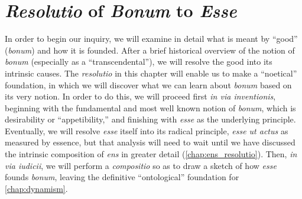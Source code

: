 
\chapter{\emph{Resolutio} of \emph{Bonum} to \emph{Esse}}
\label{chap:bonum}

In order to begin our inquiry, we will examine in detail what is meant by ``good'' (\emph{bonum}) and how it is founded. After a brief historical overview of the notion of \emph{bonum} (especially as a ``transcendental''), we will resolve the good into its intrinsic causes. The \emph{resolutio} in this chapter will enable us to make a ``noetical'' foundation, in which we will discover what we can learn about \emph{bonum} based on its very notion. In order to do this, we will proceed first \emph{in via inventionis}, beginning with the fundamental and most well known notion of \emph{bonum}, which is desirability or ``appetibility,'' and finishing with \emph{esse} as the underlying principle. Eventually, we will resolve \emph{esse} itself into its radical principle, \emph{esse ut actus} as measured by essence, but that analysis will need to wait until we have discussed the intrinsic composition of \emph{ens} in greater detail (\autoref{chap:ens_resolutio}). Then, \emph{in via iudicii}, we will perform a \emph{compositio} so as to draw a sketch of how \emph{esse} founds \emph{bonum}, leaving the definitive ``ontological'' foundation for \autoref{chap:dynamism}.%
%
